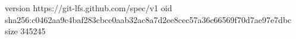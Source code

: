 version https://git-lfs.github.com/spec/v1
oid sha256:c0462aa9c4baf283cbce0aab32ac8a7d2ee8cec57a36c66569f70d7ae97e7dbc
size 345245
